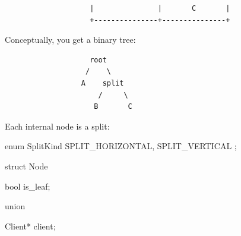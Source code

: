\documentclass{report}
\begin{document}
\begin{itemize}
\begin{verbatim}
                    |               |       C       |
                    +---------------+---------------+
                \end{verbatim}
                Conceptually, you get a binary tree:
                \begin{verbatim}
                    root
                   /    \
                  A    split
                      /     \
                     B       C
                \end{verbatim}
                \bigbreak \noindent 
                Each internal node is a split:
                \bigbreak \noindent 
                \begin{cppcode}
                    enum SplitKind {
                        SPLIT_HORIZONTAL,
                        SPLIT_VERTICAL
                    };

                    struct Node {
                        bool is_leaf;

                        union {
                            Client* client;

}}
\end{cppcode}
\end{itemize}
\end{document}
